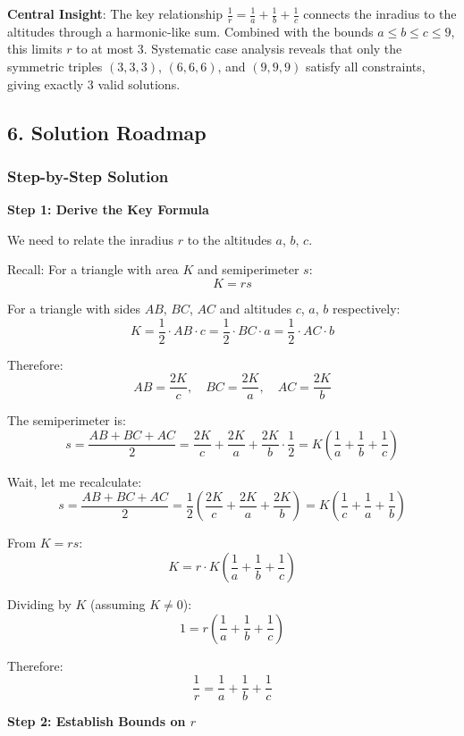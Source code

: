 \documentclass[12pt]{article}
\begin{document}
\begin{keyinsight}
\textbf{Central Insight}: The key relationship $\frac{1}{r} = \frac{1}{a} + \frac{1}{b} + \frac{1}{c}$ connects the inradius to the altitudes through a harmonic-like sum. Combined with the bounds $a \leq b \leq c \leq 9$, this limits $r$ to at most 3. Systematic case analysis reveals that only the symmetric triples $(3, 3, 3)$, $(6, 6, 6)$, and $(9, 9, 9)$ satisfy all constraints, giving exactly 3 valid solutions.
\end{keyinsight}

\begin{solutionbox}
\subsection*{6. Solution Roadmap}

\subsubsection*{Step-by-Step Solution}

\textbf{Step 1: Derive the Key Formula}

We need to relate the inradius $r$ to the altitudes $a$, $b$, $c$.

Recall: For a triangle with area $K$ and semiperimeter $s$:
$$K = rs$$

For a triangle with sides $AB$, $BC$, $AC$ and altitudes $c$, $a$, $b$ respectively:
$$K = \frac{1}{2} \cdot AB \cdot c = \frac{1}{2} \cdot BC \cdot a = \frac{1}{2} \cdot AC \cdot b$$

Therefore:
$$AB = \frac{2K}{c}, \quad BC = \frac{2K}{a}, \quad AC = \frac{2K}{b}$$

The semiperimeter is:
$$s = \frac{AB + BC + AC}{2} = \frac{2K}{c} + \frac{2K}{a} + \frac{2K}{b} \cdot \frac{1}{2} = K\left(\frac{1}{a} + \frac{1}{b} + \frac{1}{c}\right)$$

Wait, let me recalculate:
$$s = \frac{AB + BC + AC}{2} = \frac{1}{2}\left(\frac{2K}{c} + \frac{2K}{a} + \frac{2K}{b}\right) = K\left(\frac{1}{c} + \frac{1}{a} + \frac{1}{b}\right)$$

From $K = rs$:
$$K = r \cdot K\left(\frac{1}{a} + \frac{1}{b} + \frac{1}{c}\right)$$

Dividing by $K$ (assuming $K \neq 0$):
$$1 = r\left(\frac{1}{a} + \frac{1}{b} + \frac{1}{c}\right)$$

Therefore:
$$\boxed{\frac{1}{r} = \frac{1}{a} + \frac{1}{b} + \frac{1}{c}}$$

\textbf{Step 2: Establish Bounds on $r$}


\end{solutionbox}
\end{document}
